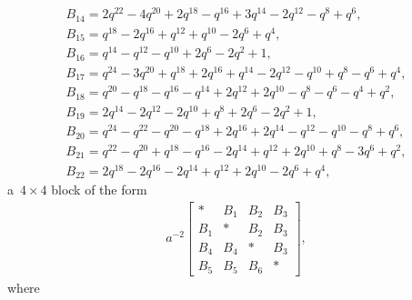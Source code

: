 \documentclass[pdftex]{sigma}
\numberwithin{equation}{section}
\theoremstyle{definition}
\newcommand{\flac}[2]{#1}
\begin{document}
\begin{gather*}
 B_{14} =
\flac{2q^{22}}{a^2}-\flac{4q^{20}}{a^2}+\flac{2q^{18}}{a^2}-\flac{q^{16}}{a^2}+\flac{3q^{14}}{a^2}-\flac{2q^{12}}{a^2}-\flac{q^{8}}{a^2}+\flac{q^{6}}{a^2}, \\
 B_{15} =
\flac{q^{18}}{a^2}-\flac{2q^{16}}{a^2}+\flac{q^{12}}{a^2}+\flac{q^{10}}{a^2}-\flac{2q^{6}}{a^2}+\flac{q^{4}}{a^2}, \\
 B_{16} =
\flac{q^{14}}{a^2}-\flac{q^{12}}{a^2}-\flac{q^{10}}{a^2}+\flac{2q^{6}}{a^2}-\flac{2q^{2}}{a^2}+\flac{1}{a^2}, \\
 B_{17} =
\flac{q^{24}}{a^2}-\flac{3q^{20}}{a^2}+\flac{q^{18}}{a^2}+\flac{2q^{16}}{a^2}+\flac{q^{14}}{a^2}-\flac{2q^{12}}{a^2}-\flac{q^{10}}{a^2}+\flac{q^{8}}{a^2}-\flac{q^{6}}{a^2}+\flac{q^{4}}{a^2}, \\
 B_{18} =
\flac{q^{20}}{a^2}-\flac{q^{18}}{a^2}-\flac{q^{16}}{a^2}-\flac{q^{14}}{a^2}+\flac{2q^{12}}{a^2}+\flac{2q^{10}}{a^2}-\flac{q^{8}}{a^2}-\flac{q^{6}}{a^2}-\flac{q^{4}}{a^2}+\flac{q^{2}}{a^2}, \\
 B_{19} =
\flac{2q^{14}}{a^2}-\flac{2q^{12}}{a^2}-\flac{2q^{10}}{a^2}+\flac{q^{8}}{a^2}+\flac{2q^{6}}{a^2}-\flac{2q^{2}}{a^2}+\flac{1}{a^2}, \\
 B_{20} =
\flac{q^{24}}{a^2}-\flac{q^{22}}{a^2}-\flac{q^{20}}{a^2}-\flac{q^{18}}{a^2}+\flac{2q^{16}}{a^2}+\flac{2q^{14}}{a^2}-\flac{q^{12}}{a^2}-\flac{q^{10}}{a^2}-\flac{q^{8}}{a^2}+\flac{q^{6}}{a^2}, \\
 B_{21} =
\flac{q^{22}}{a^2}-\flac{q^{20}}{a^2}+\flac{q^{18}}{a^2}-\flac{q^{16}}{a^2}-\flac{2q^{14}}{a^2}+\flac{q^{12}}{a^2}+\flac{2q^{10}}{a^2}+\flac{q^{8}}{a^2}-\flac{3q^{6}}{a^2}+\flac{q^{2}}{a^2}, \\
 B_{22} =
\flac{2q^{18}}{a^2}-\flac{2q^{16}}{a^2}-\flac{2q^{14}}{a^2}+\flac{q^{12}}{a^2}+\flac{2q^{10}}{a^2}-\flac{2q^{6}}{a^2}+\flac{q^{4}}{a^2},
\end{gather*}
a~$4 \times 4$ block of the form
\begin{align*}
 a^{-2} \begin{bmatrix}
 * & B_1 & B_2 & B_3 \\
 B_1 & * & B_2 & B_3 \\
 B_4 & B_4 & * & B_3 \\
 B_5 & B_5 & B_6 & *
 \end{bmatrix},
\end{align*}
where
\end{document}
